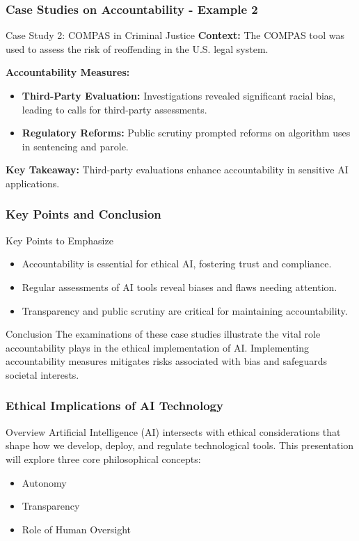 \documentclass[aspectratio=169]{beamer}
\begin{document}
\begin{frame}[fragile]
    \frametitle{Case Studies on Accountability - Example 2}
    \begin{block}{Case Study 2: COMPAS in Criminal Justice}
        \textbf{Context:} The COMPAS tool was used to assess the risk of reoffending in the U.S. legal system.
        
        \textbf{Accountability Measures:}
        \begin{itemize}
            \item \textbf{Third-Party Evaluation:} Investigations revealed significant racial bias, leading to calls for third-party assessments.
            \item \textbf{Regulatory Reforms:} Public scrutiny prompted reforms on algorithm uses in sentencing and parole.
        \end{itemize}
        
        \textbf{Key Takeaway:} Third-party evaluations enhance accountability in sensitive AI applications.
    \end{block}
\end{frame}

\begin{frame}[fragile]
    \frametitle{Key Points and Conclusion}
    \begin{block}{Key Points to Emphasize}
        \begin{itemize}
            \item Accountability is essential for ethical AI, fostering trust and compliance.
            \item Regular assessments of AI tools reveal biases and flaws needing attention.
            \item Transparency and public scrutiny are critical for maintaining accountability.
        \end{itemize}
    \end{block}
    
    \begin{block}{Conclusion}
        The examinations of these case studies illustrate the vital role accountability plays in the ethical implementation of AI. Implementing accountability measures mitigates risks associated with bias and safeguards societal interests.
    \end{block}
\end{frame}

\begin{frame}[fragile]
    \frametitle{Ethical Implications of AI Technology}
    \begin{block}{Overview}
        Artificial Intelligence (AI) intersects with ethical considerations that shape how we develop, deploy, and regulate technological tools. This presentation will explore three core philosophical concepts:
        \begin{itemize}
            \item Autonomy
            \item Transparency
            \item Role of Human Oversight
        \end{itemize}
    \end{block}
\end{frame}
\end{document}
